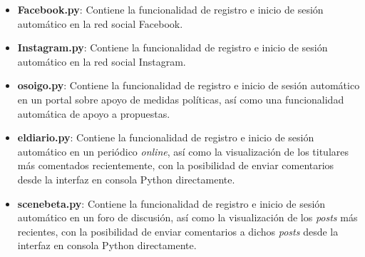 \begin{itemize}
	\item \textbf{Facebook.py}: Contiene la funcionalidad de registro e inicio de sesión automático en la red social Facebook.
	\item \textbf{Instagram.py}: Contiene la funcionalidad de registro e inicio de sesión automático en la red social Instagram.
	\item \textbf{osoigo.py}: Contiene la funcionalidad de registro e inicio de sesión automático en un portal sobre apoyo de medidas políticas, así como una funcionalidad automática de apoyo a propuestas.
	\item \textbf{eldiario.py}: Contiene la funcionalidad de registro e inicio de sesión automático en un periódico \textit{online}, así como la visualización de los titulares más comentados recientemente, con la posibilidad de enviar comentarios desde la interfaz en consola Python directamente.
	\item \textbf{scenebeta.py}: Contiene la funcionalidad de registro e inicio de sesión automático en un foro de discusión, así como la visualización de los \textit{posts} más recientes, con la posibilidad de enviar comentarios a dichos \textit{posts} desde la interfaz en consola Python directamente.
\end{itemize}